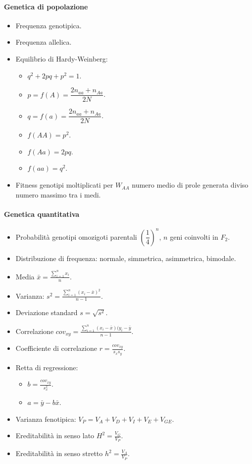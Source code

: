 \begin{multicols}{2}
\paragraph*{Genetica di popolazione}
\begin{itemize}
	\item Frequenza genotipica.
	\item Frequenza allelica.
	\item Equilibrio di Hardy-Weinberg:
		\begin{itemize}
			\item $q^2+2pq+p^2 = 1$.
			\item $p = f(A) = \dfrac{2n_{aa} + n_{Aa}}{2N}$.
			\item $q = f(a) = \dfrac{2n_{aa}+n_{Aa}}{2N}$.
			\item $f(AA) = p^2$.
			\item $f(Aa) = 2pq$.
			\item $f(aa) = q^2$.
		\end{itemize}
	\item Fitness genotipi moltiplicati per $W_{AA}$ numero medio di prole generata diviso numero massimo tra i medi.
\end{itemize}

\paragraph*{Genetica quantitativa}
\begin{itemize}
	\item Probabilit\`a genotipi omozigoti parentali $(\dfrac{1}{4})^n$, $n$ geni coinvolti in $F_2$.
	\item Distribuzione di frequenza: normale, simmetrica, asimmetrica, bimodale.
	\item Media $\bar{x} = \frac{\sum\limits_{i = 1}^n x_i}{n}$.
	\item Varianza: $s^2 = \frac{\sum\limits_{i = 1}^n(x_i - \bar{x})^2}{n-1}$.
	\item Deviazione standard $s = \sqrt{s^2}$.
	\item Correlazione $cov_{xy} = \frac{\sum\limits_{i = 1}^n(x_i - \bar{x})(y_i - \bar{y}}{n-1}$.
	\item Coefficiente di correlazione $r = \frac{cov_{xy}}{s_xs_y}$.
	\item Retta di regressione:
		\begin{itemize}
			\item $b=\frac{cov_{xy}}{s^2_x}$.
			\item $a=\bar{y}-b\bar{x}$.
		\end{itemize}
	\item Varianza fenotipica: $V_P = V_A+V_D+V_I+V_E+V_{GE}$.
	\item Ereditabilit\`a in senso lato $H^2=\frac{V_G}{V_P}$.
	\item Ereditabilit\`a in senso stretto $h^2=\frac{V_A}{V_P}$.
\end{itemize}
\end{multicols}


